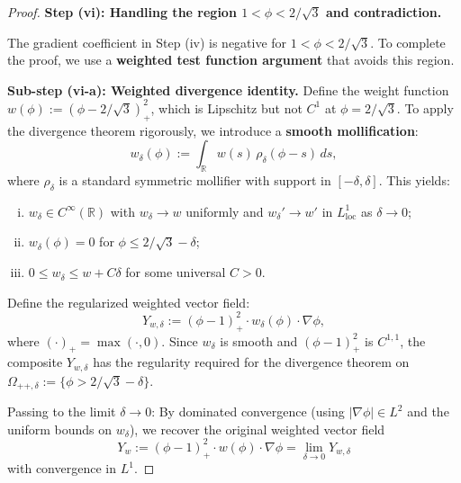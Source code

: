 \begin{proof}
\textbf{Step (vi): Handling the region $1 < \phi < 2/\sqrt{3}$ and contradiction.}

The gradient coefficient in Step (iv) is negative for $1 < \phi < 2/\sqrt{3}$. To complete the proof, we use a \textbf{weighted test function argument} that avoids this region.

\textbf{Sub-step (vi-a): Weighted divergence identity.}
Define the weight function $w(\phi) := (\phi - 2/\sqrt{3})_+^2$, which is Lipschitz but not $C^1$ at $\phi = 2/\sqrt{3}$. To apply the divergence theorem rigorously, we introduce a \textbf{smooth mollification}:
\begin{equation}
    w_\delta(\phi) := \int_{\mathbb{R}} w(s) \, \rho_\delta(\phi - s) \, ds,
\end{equation}
where $\rho_\delta$ is a standard symmetric mollifier with support in $[-\delta, \delta]$. This yields:
\begin{enumerate}[(i)]
    \item $w_\delta \in C^\infty(\mathbb{R})$ with $w_\delta \to w$ uniformly and $w_\delta' \to w'$ in $L^1_{\mathrm{loc}}$ as $\delta \to 0$;
    \item $w_\delta(\phi) = 0$ for $\phi \le 2/\sqrt{3} - \delta$;
    \item $0 \le w_\delta \le w + C\delta$ for some universal $C > 0$.
\end{enumerate}

Define the regularized weighted vector field:
\begin{equation}
    Y_{w,\delta} := (\phi - 1)_+^2 \cdot w_\delta(\phi) \cdot \nabla\phi,
\end{equation}
where $(\cdot)_+ = \max(\cdot, 0)$. Since $w_\delta$ is smooth and $(\phi - 1)_+^2$ is $C^{1,1}$, the composite $Y_{w,\delta}$ has the regularity required for the divergence theorem on $\Omega_{++,\delta} := \{\phi > 2/\sqrt{3} - \delta\}$.

Passing to the limit $\delta \to 0$: By dominated convergence (using $|\nabla\phi| \in L^2$ and the uniform bounds on $w_\delta$), we recover the original weighted vector field
\begin{equation}
    Y_w := (\phi - 1)_+^2 \cdot w(\phi) \cdot \nabla\phi = \lim_{\delta \to 0} Y_{w,\delta}
\end{equation}
with convergence in $L^1$.


\end{proof}
